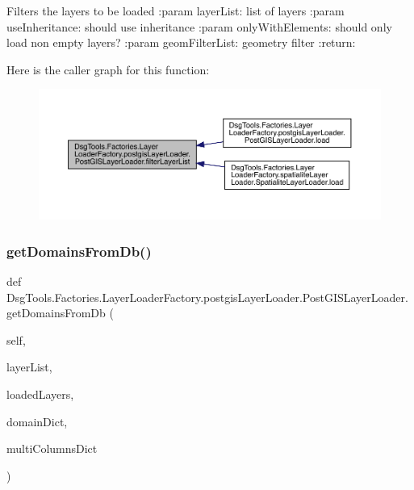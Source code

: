 \begin{DoxyVerb}Filters the layers to be loaded
:param layerList: list of layers
:param useInheritance: should use inheritance
:param onlyWithElements: should only load non empty layers?
:param geomFilterList: geometry filter
:return:
\end{DoxyVerb}
 Here is the caller graph for this function\+:
\nopagebreak
\begin{figure}[H]
\begin{center}
\leavevmode
\includegraphics[width=350pt]{class_dsg_tools_1_1_factories_1_1_layer_loader_factory_1_1postgis_layer_loader_1_1_post_g_i_s_layer_loader_a422c789db99e9e2887da74ae63ff7a5e_icgraph}
\end{center}
\end{figure}
\mbox{\label{class_dsg_tools_1_1_factories_1_1_layer_loader_factory_1_1postgis_layer_loader_1_1_post_g_i_s_layer_loader_ae57be9ea3f619b7d90adf6f0c371f8c8}} 
\subsubsection{\texorpdfstring{get\+Domains\+From\+Db()}{getDomainsFromDb()}}
{\footnotesize\ttfamily def Dsg\+Tools.\+Factories.\+Layer\+Loader\+Factory.\+postgis\+Layer\+Loader.\+Post\+G\+I\+S\+Layer\+Loader.\+get\+Domains\+From\+Db (\begin{DoxyParamCaption}\item[{}]{self,  }\item[{}]{layer\+List,  }\item[{}]{loaded\+Layers,  }\item[{}]{domain\+Dict,  }\item[{}]{multi\+Columns\+Dict }\end{DoxyParamCaption})}

